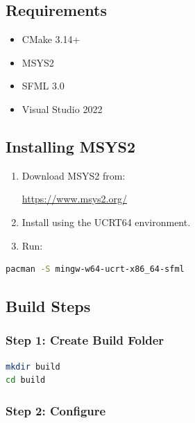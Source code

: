 \documentclass[11pt]{article}
\begin{document}
\subsection{Requirements}

\begin{itemize}
    \item CMake 3.14+
    \item MSYS2
    \item SFML 3.0
    \item Visual Studio 2022
\end{itemize}


\subsection{Installing MSYS2}

\begin{enumerate}
    \item Download MSYS2 from:
    
    \url{https://www.msys2.org/}
    
    \item Install using the UCRT64 environment.
    
    \item Run:
\end{enumerate}

\begin{lstlisting}[language=bash]
pacman -S mingw-w64-ucrt-x86_64-sfml
\end{lstlisting}


\subsection{Build Steps}

\subsubsection{Step 1: Create Build Folder}

\begin{lstlisting}[language=bash]
mkdir build
cd build
\end{lstlisting}

\subsubsection{Step 2: Configure}
\end{document}
